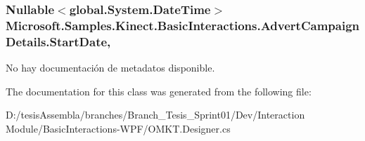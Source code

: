 \hypertarget{class_microsoft_1_1_samples_1_1_kinect_1_1_basic_interactions_1_1_advert_campaign_details_af3c3f72b1e11364497632ca2d3ba6da7}{
\subsubsection[{Start\-Date}]{\setlength{\rightskip}{0pt plus 5cm}Nullable$<$global.\-System.\-Date\-Time$>$ Microsoft.\-Samples.\-Kinect.\-Basic\-Interactions.\-Advert\-Campaign\-Details.\-Start\-Date\hspace{0.3cm}{\ttfamily [get]}, {\ttfamily [set]}}}\label{class_microsoft_1_1_samples_1_1_kinect_1_1_basic_interactions_1_1_advert_campaign_details_af3c3f72b1e11364497632ca2d3ba6da7}


No hay documentación de metadatos disponible. 



The documentation for this class was generated from the following file\-:\begin{DoxyCompactItemize}
\item 
D\-:/tesis\-Assembla/branches/\-Branch\-\_\-\-Tesis\-\_\-\-Sprint01/\-Dev/\-Interaction Module/\-Basic\-Interactions-\/\-W\-P\-F/O\-M\-K\-T.\-Designer.\-cs\end{DoxyCompactItemize}
